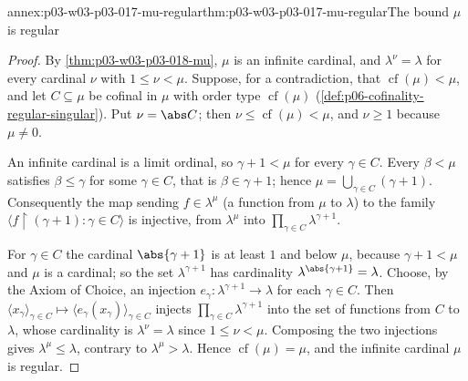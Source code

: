 \begin{annexitem}{annex:p03-w03-p03-017-mu-regular}{thm:p03-w03-p03-017-mu-regular}{The bound \(\mu\) is regular}
\begin{proof}
By \cref{thm:p03-w03-p03-018-mu}, \(\mu\) is an infinite cardinal, and
\(\lambda^\nu=\lambda\) for every cardinal \(\nu\) with \(1\le\nu<\mu\).
Suppose, for a contradiction, that \(\operatorname{cf}(\mu)<\mu\), and let
\(C\subseteq\mu\) be cofinal in \(\mu\) with order type
\(\operatorname{cf}(\mu)\) (\cref{def:p06-cofinality-regular-singular}).
Put \(\nu=\abs C\); then \(\nu\le\operatorname{cf}(\mu)<\mu\), and
\(\nu\ge1\) because \(\mu\neq0\).

An infinite cardinal is a limit ordinal, so \(\gamma+1<\mu\) for every
\(\gamma\in C\).  Every \(\beta<\mu\) satisfies \(\beta\le\gamma\) for some
\(\gamma\in C\), that is \(\beta\in\gamma+1\); hence
\(\mu=\bigcup_{\gamma\in C}(\gamma+1)\).  Consequently the map sending
\(f\in\lambda^\mu\) (a function from \(\mu\) to \(\lambda\)) to the family
\(\langle f\restriction(\gamma+1):\gamma\in C\rangle\) is injective, from
\(\lambda^\mu\) into \(\prod_{\gamma\in C}\lambda^{\gamma+1}\).

For \(\gamma\in C\) the cardinal \(\abs{\gamma+1}\) is at least \(1\) and
below \(\mu\), because \(\gamma+1<\mu\) and \(\mu\) is a cardinal; so the
set \(\lambda^{\gamma+1}\) has cardinality
\(\lambda^{\abs{\gamma+1}}=\lambda\).  Choose, by the Axiom of Choice, an
injection \(e_\gamma:\lambda^{\gamma+1}\to\lambda\) for each \(\gamma\in C\).
Then \(\langle x_\gamma\rangle_{\gamma\in C}\mapsto
\langle e_\gamma(x_\gamma)\rangle_{\gamma\in C}\) injects
\(\prod_{\gamma\in C}\lambda^{\gamma+1}\) into the set of functions from
\(C\) to \(\lambda\), whose cardinality is \(\lambda^\nu=\lambda\) since
\(1\le\nu<\mu\).  Composing the two injections gives
\(\lambda^\mu\le\lambda\), contrary to \(\lambda^\mu>\lambda\).  Hence
\(\operatorname{cf}(\mu)=\mu\), and the infinite cardinal \(\mu\) is
regular.
\end{proof}
\end{annexitem}

